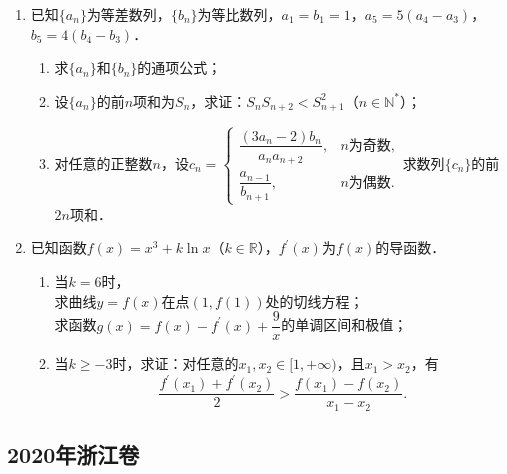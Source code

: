 \begin{description}
\begin{enumerate}[leftmargin=5pt]
\begin{enumerate}[label=(\arabic*)]
            \item 已知点$C$满足$3\overrightarrow{OC}=\overrightarrow{OF}$，点$B$在椭圆上（$B$异于椭圆的顶点），直线$AB$与以$C$为圆心的圆相切于点$P$，且$P$为线段$AB$的中点．求直线$AB$的方程．
        \end{enumerate}
        \item 已知$\{a_{n}\}$为等差数列，$\{b_{n}\}$为等比数列，$a_{1}=b_{1}=1$，$a_{5}=5(a_{4}-a_{3})$，$b_{5}=4(b_{4}-b_{3})$．
        \begin{enumerate}[label=(\arabic*)]
            \item 求$\{a_{n}\}$和$\{b_{n}\}$的通项公式；
            \item 设$\{a_{n}\}$的前$n$项和为$S_{n}$，求证：$S_{n}S_{n+2}<S_{n+1}^{2}$（$n\in\mathbb{N}^{*}$）；
            \item 对任意的正整数$n$，设$c_{n}=\begin{cases}\dfrac{(3a_{n}-2)b_{n}}{a_{n}a_{n+2}},&n\text{为奇数},\\[8pt]\dfrac{a_{n-1}}{b_{n+1}},&n\text{为偶数}.\end{cases}$求数列$\{c_{n}\}$的前$2n$项和．
        \end{enumerate}
        \item 已知函数$f(x)=x^{3}+k\ln x$（$k\in\mathbb{R}$），$f^{\prime}(x)$为$f(x)$的导函数．
        \begin{enumerate}[label=(\arabic*)]
            \item 当$k=6$时，\\
            求曲线$y=f(x)$在点$(1,f(1))$处的切线方程；\\
            求函数$g(x)=f(x)-f^{\prime}(x)+\dfrac{9}{x}$的单调区间和极值；
            \item 当$k\geqslant -3$时，求证：对任意的$x_{1},x_{2}\in[1,+\infty)$，且$x_{1}>x_{2}$，有$$\dfrac{f^{\prime}(x_{1})+f^{\prime}(x_{2})}{2}>\dfrac{f(x_{1})-f(x_{2})}{x_{1}-x_{2}}.$$
        \end{enumerate}
    \end{enumerate}
\end{description}
\clearpage

\subsection{2020年浙江卷}\label{gk:2020年浙江卷}

